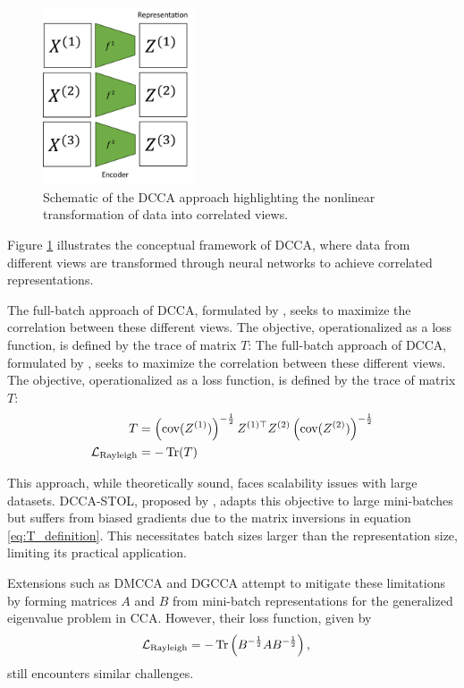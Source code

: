\begin{figure}
    \centering
    \includegraphics[width=0.4\textwidth]{figures/dcca_schematic}
    \caption{Schematic of the DCCA approach highlighting the nonlinear transformation of data into correlated views.}
    \label{fig:dcca_schematic}
\end{figure}

Figure \ref{fig:dcca_schematic} illustrates the conceptual framework of DCCA, where data from different views are transformed through neural networks to achieve correlated representations.

The full-batch approach of DCCA, formulated by \citet{andrew2013deep}, seeks to maximize the correlation between these different views.
The objective, operationalized as a loss function, is defined by the trace of matrix \( T \):
The full-batch approach of DCCA, formulated by \citet{andrew2013deep}, seeks to maximize the correlation between these different views.
The objective, operationalized as a loss function, is defined by the trace of matrix \( T \):
\begin{align}
    T &= \left(\text{cov}(Z^{(1)})\right)^{-\frac{1}{2}} Z^{(1)\top} Z^{(2)} \left(\text{cov}(Z^{(2)})\right)^{-\frac{1}{2}} \label{eq:T_definition} \\
    \mathcal{L}_\text{Rayleigh} &= -\operatorname{Tr}(T) \label{eq:loss_function}
\end{align}

This approach, while theoretically sound, faces scalability issues with large datasets.
DCCA-STOL, proposed by \citet{wang2015unsupervised}, adapts this objective to large mini-batches but suffers from biased gradients due to the matrix inversions in equation \eqref{eq:T_definition}.
This necessitates batch sizes larger than the representation size, limiting its practical application.

Extensions such as DMCCA \citep{somandepalli2019multimodal} and DGCCA \citep{benton2017deep} attempt to mitigate these limitations by forming matrices \( A \) and \( B \) from mini-batch representations for the generalized eigenvalue problem in CCA. However, their loss function, given by
\begin{align}
    \mathcal{L}_\text{Rayleigh} &= -\operatorname{Tr}\left(B^{-\frac{1}{2}} A B^{-\frac{1}{2}}\right),
\end{align}
still encounters similar challenges.

